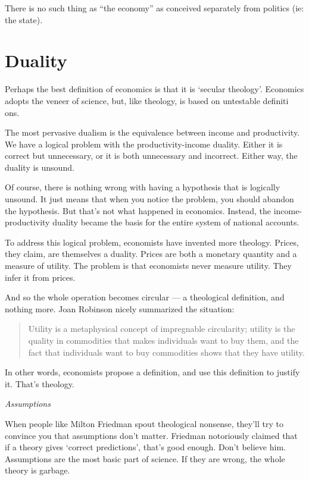 \documentclass[
]{book}
\begin{document}
There is no such thing as ``the economy'' as conceived separately
from politics (ie: the state).

\hypertarget{duality}{%
\chapter{Duality}\label{duality}}

Perhaps the best definition of economics is that it is `secular theology'.
Economics adopts the veneer of science, but, like theology, is based on untestable definiti\\
ons.

The most pervasive dualism is the equivalence between income and productivity.
We have a logical problem with the productivity-income duality. Either it is correct but unnecessary, or it is both unnecessary and incorrect. Either way, the duality is unsound.

Of course, there is nothing wrong with having a hypothesis that is logically unsound. It just means that when you notice the problem, you should abandon the hypothesis. But that's not what happened in economics. Instead, the income-productivity duality became the basis for the entire system of national accounts.

To address this logical problem, economists have invented more theology. Prices, they claim, are themselves a duality. Prices are both a monetary quantity and a measure of utility.
The problem is that economists never measure utility. They infer it from prices.

And so the whole operation becomes circular --- a theological definition, and nothing more. Joan Robinson nicely summarized the situation:

\begin{quote}
Utility is a metaphysical concept of impregnable circularity; utility is the quality in commodities that makes individuals want to buy them, and the fact that individuals want to buy commodities shows that they have utility.
\end{quote}

In other words, economists propose a definition, and use this definition to justify it.
That's theology.

\emph{Assumptions}

When people like Milton Friedman spout theological nonsense, they'll try to convince you that assumptions don't matter. Friedman notoriously claimed that if a theory gives `correct predictions', that's good enough. Don't believe him. Assumptions are the most basic part of science. If they are wrong, the whole theory is garbage.
\end{document}
